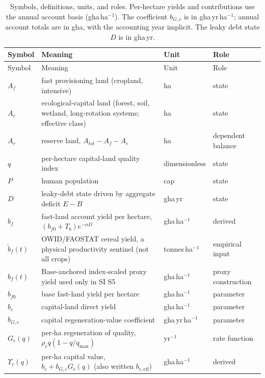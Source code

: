 \documentclass[11pt,a4paper]{article}
\newcommand{\Ups}{\Upsilon_c}
\begin{document}
\begin{longtable}{>{\raggedright\arraybackslash}p{}>{\raggedright\arraybackslash}p{}>{\raggedright\arraybackslash}p{}>{\raggedright\arraybackslash}p{}}
\caption{Symbols, definitions, units, and roles. Per-hectare yields and contributions use the annual account basis (gha\,ha$^{-1}$). The coefficient $b_{G,c}$ is in gha\,yr\,ha$^{-1}$; annual account totals are in gha, with the accounting year implicit. The leaky debt state $D$ is in gha\,yr.}\label{tab:si_symbols}\\
\toprule
Symbol & Meaning & Unit & Role \\
\midrule
\endfirsthead
\toprule
Symbol & Meaning & Unit & Role \\
\midrule
\endhead
$A_f$ & fast provisioning land (cropland, intensive) & ha & state \\
$A_c$ & ecological-capital land (forest, soil, wetland, long-rotation systems; effective class) & ha & state \\
$A_r$ & reserve land, $A_{tot}-A_f-A_c$ & ha & dependent balance \\
$q$ & per-hectare capital-land quality index & dimensionless & state \\
$P$ & human population & cap & state \\
$D$ & leaky-debt state driven by aggregate deficit $E-B$ & gha\,yr & state \\
$b_f$ & fast-land account yield per hectare, $(b_{f0}+T_b)e^{-\alpha D}$ & gha\,ha$^{-1}$ & derived \\
$\tilde b_f(t)$ & OWID/FAOSTAT cereal yield, a physical productivity sentinel (not all crops) & tonnes\,ha$^{-1}$ & empirical input \\
$\hat b_f(t)$ & Base-anchored index-scaled proxy yield used only in SI S5 & gha\,ha$^{-1}$ & proxy construction \\
$b_{f0}$ & base fast-land yield per hectare & gha\,ha$^{-1}$ & parameter \\
$b_c$ & capital-land direct yield & gha\,ha$^{-1}$ & parameter \\
$b_{G,c}$ & capital regeneration-value coefficient & gha\,yr\,ha$^{-1}$ & parameter \\
$G_c(q)$ & per-ha regeneration of quality, $\rho_cq(1-q/q_{\max})$ & yr$^{-1}$ & rate function \\
$\Ups(q)$ & per-ha capital value, $b_c+b_{G,c}G_c(q)$ (also written $b_{c,\mathrm{eff}}$) & gha\,ha$^{-1}$ & derived \\

\end{longtable}
\end{document}
